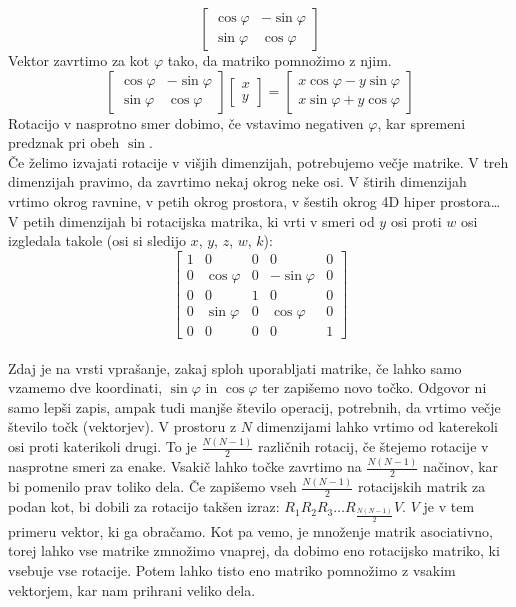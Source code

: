 \documentclass[a4paper, 12px]{article}
\begin{document}
    $$\begin{bmatrix}
        \cos\varphi & - \sin\varphi \\
        \sin\varphi & \cos\varphi
    \end{bmatrix}$$
    Vektor zavrtimo za kot $\varphi$ tako, da matriko pomnožimo z njim.
    $$\begin{bmatrix}
        \cos\varphi & - \sin\varphi \\
        \sin\varphi & \cos\varphi
    \end{bmatrix} \begin{bmatrix}
        x \\ y
    \end{bmatrix} = \begin{bmatrix}
        x \cos\varphi - y \sin\varphi \\
        x \sin\varphi + y \cos\varphi
    \end{bmatrix}$$
    Rotacijo v nasprotno smer dobimo, če vstavimo negativen $\varphi$, kar spremeni predznak pri obeh $\sin$. 
    \cite{TransformationWiki}\\
    
    Če želimo izvajati rotacije v višjih dimenzijah, potrebujemo večje matrike. V treh dimenzijah pravimo,
    da zavrtimo nekaj okrog neke osi. V štirih dimenzijah vrtimo okrog ravnine, v petih okrog prostora, v šestih
    okrog 4D hiper prostora\dots\\

    V petih dimenzijah bi rotacijska matrika, ki vrti v smeri od $y$ osi proti $w$ osi izgledala takole 
    (osi si sledijo $x$, $y$, $z$, $w$, $k$):
    $$\begin{bmatrix}
        1 & 0 & 0 & 0 & 0 \\
        0 & \cos\varphi & 0 & -\sin\varphi & 0 \\
        0 & 0 & 1 & 0 & 0 \\
        0 & \sin\varphi & 0 & \cos\varphi & 0 \\
        0 & 0 & 0 & 0 & 1
    \end{bmatrix}$$\\

    Zdaj je na vrsti vprašanje, zakaj sploh uporabljati matrike, če lahko samo vzamemo dve koordinati, $\sin\varphi$ in $\cos\varphi$
    ter zapišemo novo točko. Odgovor ni samo lepši zapis, ampak tudi manjše število operacij, potrebnih,
    da vrtimo večje število točk (vektorjev). V prostoru z $N$ dimenzijami lahko vrtimo od katerekoli osi
    proti katerikoli drugi. To je $\frac{N(N-1)}{2}$ različnih rotacij, če štejemo rotacije v nasprotne smeri za enake.
    Vsakič lahko točke zavrtimo na $\frac{N(N-1)}{2}$ načinov, kar bi pomenilo prav toliko dela. Če zapišemo vseh
    $\frac{N(N-1)}{2}$ rotacijskih matrik za podan kot, bi dobili za rotacijo takšen izraz:
    $R_1 R_2 R_3 \dots R_{\frac{N(N-1)}{2}} V$. $V$ je v tem primeru vektor, ki ga obračamo.
    Kot pa vemo, je množenje matrik asociativno, torej lahko vse matrike zmnožimo vnaprej, da dobimo eno rotacijsko matriko,
    ki vsebuje vse rotacije. Potem lahko tisto eno matriko pomnožimo z vsakim vektorjem, kar nam prihrani veliko dela.\\
\end{document}
